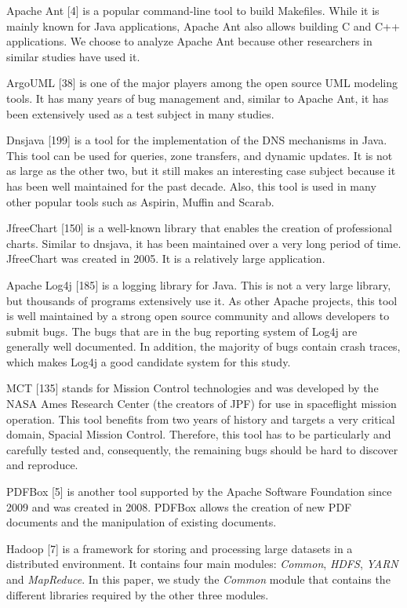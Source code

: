 \documentclass[12pt]{report}
\begin{document}
Apache Ant {[}4{]} is a popular command-line tool to build Makefiles.
While it is mainly known for Java applications, Apache Ant also allows
building C and C++ applications. We choose to analyze Apache Ant because
other researchers in similar studies have used it.

ArgoUML {[}38{]} is one of the major players among the open source UML
modeling tools. It has many years of bug management and, similar to
Apache Ant, it has been extensively used as a test subject in many
studies.

Dnsjava {[}199{]} is a tool for the implementation of the DNS mechanisms
in Java. This tool can be used for queries, zone transfers, and dynamic
updates. It is not as large as the other two, but it still makes an
interesting case subject because it has been well maintained for the
past decade. Also, this tool is used in many other popular tools such as
Aspirin, Muffin and Scarab.

JfreeChart {[}150{]} is a well-known library that enables the creation
of professional charts. Similar to dnsjava, it has been maintained over
a very long period of time. JfreeChart was created in 2005. It is a
relatively large application.

Apache Log4j {[}185{]} is a logging library for Java. This is not a very
large library, but thousands of programs extensively use it. As other
Apache projects, this tool is well maintained by a strong open source
community and allows developers to submit bugs. The bugs that are in the
bug reporting system of Log4j are generally well documented. In
addition, the majority of bugs contain crash traces, which makes Log4j a
good candidate system for this study.

MCT {[}135{]} stands for Mission Control technologies and was developed
by the NASA Ames Research Center (the creators of JPF) for use in
spaceflight mission operation. This tool benefits from two years of
history and targets a very critical domain, Spacial Mission Control.
Therefore, this tool has to be particularly and carefully tested and,
consequently, the remaining bugs should be hard to discover and
reproduce.

PDFBox {[}5{]} is another tool supported by the Apache Software
Foundation since 2009 and was created in 2008. PDFBox allows the
creation of new PDF documents and the manipulation of existing
documents.

Hadoop {[}7{]} is a framework for storing and processing large datasets
in a distributed environment. It contains four main modules:
\emph{Common}, \emph{HDFS}, \emph{YARN} and \emph{MapReduce}. In this
paper, we study the \emph{Common} module that contains the different
libraries required by the other three modules.
\end{document}
